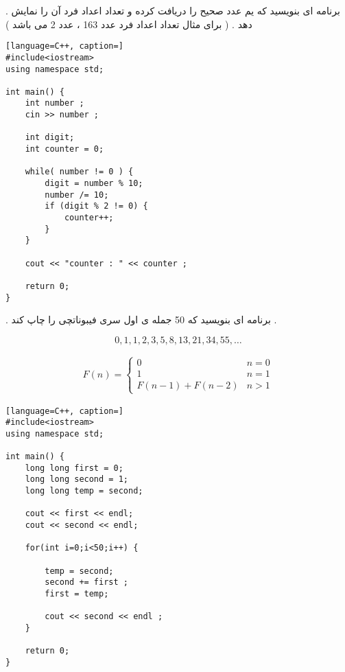 \documentclass[12pt]{article}
\begin{document}
\newpage

 . برنامه ای بنویسید که یم عدد صحیح را دریافت کرده و تعداد اعداد فرد آن را نمایش دهد . ( برای مثال تعداد اعداد فرد عدد 163 ، عدد 2 می باشد )






\begin{latin}
\begin{lstlisting}[language=C++, caption=]
#include<iostream>
using namespace std;

int main() {
	int number ;
	cin >> number ;
	
	int digit;
	int counter = 0;
	
	while( number != 0 ) {
		digit = number % 10;
		number /= 10;
		if (digit % 2 != 0) {
			counter++;
		}
	}
	
	cout << "counter : " << counter ;
	
	return 0;
}
\end{lstlisting}
\end{latin}







\newpage

 . برنامه ای بنویسید که 50 جمله ی اول سری فیبوناتچی را چاپ کند .

$$
0 , 1 , 1 , 2 , 3 , 5 , 8 , 13 , 21 , 34 , 55 , \dots
$$


\begin{align*}
F(n) = 
\begin{cases}
0 & n = 0 \\
1 & n = 1 \\
F(n-1) + F(n-2) & n > 1 
\end{cases}
\end{align*}






\begin{latin}
\begin{lstlisting}[language=C++, caption=]
#include<iostream>
using namespace std;

int main() {	
	long long first = 0;
	long long second = 1;
	long long temp = second;
	
	cout << first << endl;
	cout << second << endl;
	
	for(int i=0;i<50;i++) {
		
		temp = second;
		second += first ;
		first = temp;
		
		cout << second << endl ;
	}
	
	return 0;
}
\end{lstlisting}
\end{latin}
\end{document}
